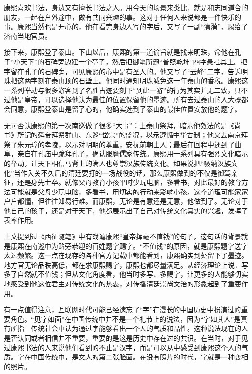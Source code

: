 
康熙喜欢书法，身边又有擅长书法之人。用今天的场景来类比，就是和志同道合的朋友，一起在户外途中，做有共同兴趣的事。这对于任何人来说都是一件快乐的事。康熙当然也是开心的，他在看完身边人写的字后，又写了一副“清漪”，赐给了济南当地官员。



接下来，康熙登了泰山。下山以后，康熙的第一道谕旨就是找来明珠，命他在孔子“小天下”的石碑旁边建一个亭子，然后把御笔所题“普照乾坤”四字悬挂其上。把字留在孔子的石碑旁，可见康熙的心中是有圣人的。他又写了“云峰”二字，告诉明珠把这两字刻在泰山顶的石壁上。他同时通知明珠减免这一年泰山的香税。康熙这一系列举动与很多游客到了名胜古迹要刻下“到此一游”的行为其实并无二致，只不过他是皇帝，可以选择他认为最佳的位置保留他的墨迹。所有去过泰山的人大概都会同意，康熙登泰山是留了心的，他确实选到了泰山的最佳位置安放他的题字。



无可否认康熙的第一次南巡做了很多“大事”：上泰山祭拜，暗示他效法的是《尚书》所记的舜帝拜祭群山、东巡“岱宗”的盛况，以示遵循中华古制；他又去南京拜祭了朱元璋的孝陵，以示对明朝的尊重，安抚前朝士人；最后在回程中还到了曲阜，亲自在孔庙中跪拜孔子，确认服膺儒家传统。康熙用一系列具有强烈文化暗示的举动，让天下相信马背上的满人也尊崇汉族传统文化。如果说把“吸纳汉族文化”当作入关不久后的清廷要打的一场战役的话，那么康熙做到的不仅是御驾亲征，还是身先士卒。就像父母教育小孩平时少玩电脑，多看书，对此最好的教育方法可能就是父母少玩电脑，多看书，用切实的行动来影响小孩。这个道理可能家家户户都懂，但往往知易行难。而康熙，无论是有意还是无意，他做到了。无论对于他自己的孩子，还是对于天下，他都展示出了自己对传统文化真实的兴趣，发挥了表率作用。



上文提到过《西征随笔》中有戏谑康熙“皇帝挥毫不值钱”的句子，这句话的背景就是康熙在南巡中为路旁恭迎的百姓题字赐字。“不值钱”的原因，就是康熙题字送字太过频繁。这一点在现存的各种官方记载中都能看到，康熙确实到处留下了墨迹。地方官无论品秩高低，都在求康熙赐字，康熙也都尽量满足。从经济理论上说，写多了自然就不值钱；但从文化角度看，他当时多写、多赐字，让更多的人能够切实地感受到他这位君主对传统文化的热衷，对传播清廷崇尚文治的形象起到了重要作用。



有一点值得注意，互联网时代可能已经遗忘了“字”在漫长的中国历史中扮演过的重要角色。“见字如面”在中国传统中并不是一个礼节上的说法，因为“字如其人”是真有所指—传统社会中认为通过字能够看出一个人的气质和品性。这种说法现在的人是否认同或者相信并不重要，重要的是这是历史中存在过的共识。在当时，对于见过康熙书法的人来说他们看到的不止是汉字，而是可以从中感受到康熙这个人的气质。字在中国传统中，是文人的第二张脸面。在没有照片的时代，字就是一种变相的照片。


